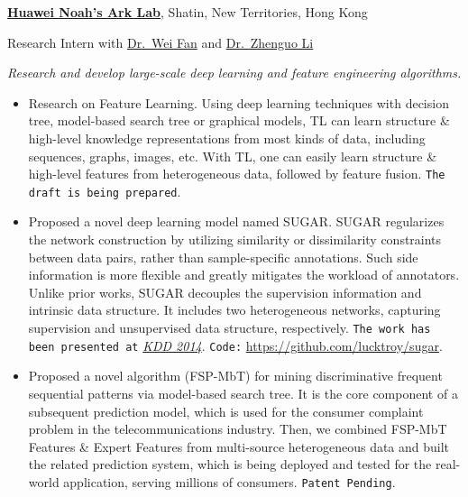 \documentclass[10pt,a4paper]{article}
\renewenvironment{description}{
  \begin{basedescript}{\desclabelstyle{\pushlabel}\desclabelwidth{8em}}
}{
  \end{basedescript}
}
\begin{document}
\begin{description}
\item[05/2013 - present]
\href{http://www.noahlab.com.hk/}{\textbf{Huawei Noah's Ark Lab}},
Shatin, New Territories, Hong Kong

Research Intern with \href{http://www.weifan.info/}{Dr.~Wei Fan} and
\href{http://www.ee.columbia.edu/~zgli/}{Dr.~Zhenguo Li}

\emph{Research and develop large-scale deep learning and feature
engineering algorithms.}

\begin{itemize}
\itemsep1pt\parskip0pt
\item
  \small Research on Feature Learning. Using deep learning techniques
  with decision tree, model-based search tree or graphical models, TL
  can learn structure \& high-level knowledge representations from most
  kinds of data, including sequences, graphs, images, etc. With TL, one
  can easily learn structure \& high-level features from heterogeneous
  data, followed by feature fusion.
  \texttt{The draft is being prepared}.
\end{itemize}

\begin{itemize}
\itemsep1pt\parskip0pt
\item
  \small Proposed a novel deep learning model named SUGAR. SUGAR
  regularizes the network construction by utilizing similarity or
  dissimilarity constraints between data pairs, rather than
  sample-specific annotations. Such side information is more flexible
  and greatly mitigates the workload of annotators. Unlike prior works,
  SUGAR decouples the supervision information and intrinsic data
  structure. It includes two heterogeneous networks, capturing
  supervision and unsupervised data structure, respectively.
  \texttt{The work has been presented at}
  \href{http://www.kdd.org/kdd2014/}{\emph{KDD 2014}}. \texttt{Code:}
  \url{https://github.com/lucktroy/sugar}.
\end{itemize}

\begin{itemize}
\itemsep1pt\parskip0pt
\item
  \small Proposed a novel algorithm (FSP-MbT) for mining discriminative
  frequent sequential patterns via model-based search tree. It is the
  core component of a subsequent prediction model, which is used for the
  consumer complaint problem in the telecommunications industry. Then,
  we combined FSP-MbT Features \& Expert Features from multi-source
  heterogeneous data and built the related prediction system, which is
  being deployed and tested for the real-world application, serving
  millions of consumers. \texttt{Patent Pending}.
\end{itemize}


\end{description}
\end{document}
